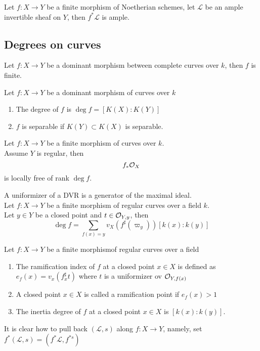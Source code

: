 \documentclass[../main.tex]{subfiles}
\begin{document}
\begin{lemma}
Let $f:X\to Y$ be a finite morphism of Noetherian schemes, let $ \mathcal{L}$ be an ample invertible sheaf on $Y$, then $f^{\ast}\mathcal{L}$ is ample.
\end{lemma}
\subsection{Degrees on curves}
\begin{lemma}
Let $f:X\to Y$ be a dominant morphism between complete curves over $k$, then $f$ is finite.
\end{lemma}
\begin{defn}[Degree]
	Let $f:X\to Y$ be a dominant morphism of curves over $k$
	\begin{enumerate}
	\item The degree of $f$ is $\deg f = [ K( X) :K( Y) ] $
	\item $f$ is separable if $K( Y) \subset K( X) $ is separable.
	\end{enumerate}
\end{defn}
\begin{propo}
Let $f:X\to Y$ be a finite morphism of curves over $k$.\\
Assume $Y$ is regular, then
\[ 
f_\ast \mathcal{O}_X 
\]
is locally free of rank $\deg f$.
\end{propo}
A uniformizer of a DVR is a generator of the maximal ideal.\\
Let $f:X\to Y$ be a finite morphism of regular curves over a field $k$.\\
Let $y \in Y$ be a closed point and $t\in \mathcal{O}_{Y,y} $, then 
\[ 
\deg  f= \sum_{f( x) = y} v_X( f^{\sharp}( \varpi_y) ) [ k( x) : k( y) ] 
\]
\begin{defn}
Let $f:X\to Y$ be a finite morphismof regular curves over a field
\begin{enumerate}
\item The ramification index of $f$ at a closed point $x\in X$ is defined as $e_f( x) = v_x( f_x^{\sharp}t) $ where $t$ is a uniformizer ov $\mathcal{O}_{Y,f( x) } $ 
\item A closed point $x\in X$ is called a ramification point if $e_f( x) >1$ 
\item The inertia degree of $f$ at a closed point $x\in X$ is $ [ k( x) : k( y) ] $.
\end{enumerate}
\end{defn}
It is clear how to pull back $(  \mathcal{L},s )$ along $f:X\to Y$, namely, set $ f^{\ast}(  \mathcal{L},s) = ( f^{\ast }\mathcal{L}, f^{\ast s}) $ 
\end{document}
